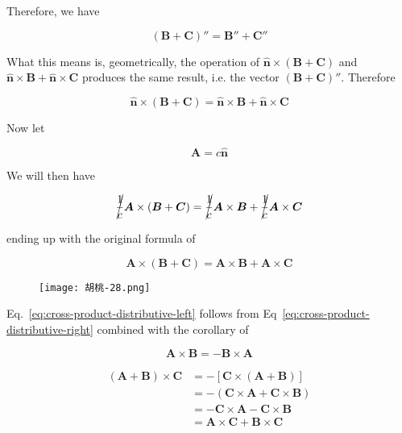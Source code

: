 Therefore, we have

\[
    (\boldsymbol{B} + \boldsymbol{C})'' = \boldsymbol{B}'' + \boldsymbol{C}''
\]

What this means is, geometrically, the operation of $\boldsymbol{\hat{n}} \times (\boldsymbol{B} + \boldsymbol{C})$ and
$\boldsymbol{\hat{n}} \times \boldsymbol{B} + \boldsymbol{\hat{n}} \times \boldsymbol{C}$ produces the same result, i.e.
the vector $(\boldsymbol{B} + \boldsymbol{C})''$. Therefore

\[
    \boldsymbol{\hat{n}} \times (\boldsymbol{B} + \boldsymbol{C}) = \boldsymbol{\hat{n}} \times \boldsymbol{B} + \boldsymbol{\hat{n}} \times \boldsymbol{C}
\]

Now let

\begin{equation}
    \boldsymbol{A} = c \boldsymbol{\hat{n}}
\end{equation}

We will then have

\[
    \cancel{\frac{1}{c}}\boldsymbol{A} \times (\boldsymbol{B} + \boldsymbol{C}) = \cancel{\frac{1}{c}}\boldsymbol{A} \times \boldsymbol{B} + \cancel{\frac{1}{c}}\boldsymbol{A} \times \boldsymbol{C}
\]

ending up with the original formula of

\[
    \boldsymbol{A} \times (\boldsymbol{B} + \boldsymbol{C}) = \boldsymbol{A} \times \boldsymbol{B} + \boldsymbol{A} \times \boldsymbol{C}
\]

\begin{figure}[H]
    \begin{flushright}
        \texttt{[image: 胡桃-28.png]}
    \end{flushright}
\end{figure}

Eq.~\ref{eq:cross-product-distributive-left} follows from Eq~\ref{eq:cross-product-distributive-right} combined with the
corollary of

\begin{equation}
    \boldsymbol{A} \times \boldsymbol{B} = - \boldsymbol{B} \times \boldsymbol{A}
\end{equation}

\begin{align*}
    (\boldsymbol{A} + \boldsymbol{B}) \times \boldsymbol{C} &= - \left[ \boldsymbol{C} \times (\boldsymbol{A} + \boldsymbol{B}) \right] \\
    &= - (\boldsymbol{C} \times \boldsymbol{A} + \boldsymbol{C} \times \boldsymbol{B}) \\
    &= - \boldsymbol{C} \times \boldsymbol{A} - \boldsymbol{C} \times \boldsymbol{B} \\
    &= \boldsymbol{A} \times \boldsymbol{C} + \boldsymbol{B} \times \boldsymbol{C}
\end{align*}

